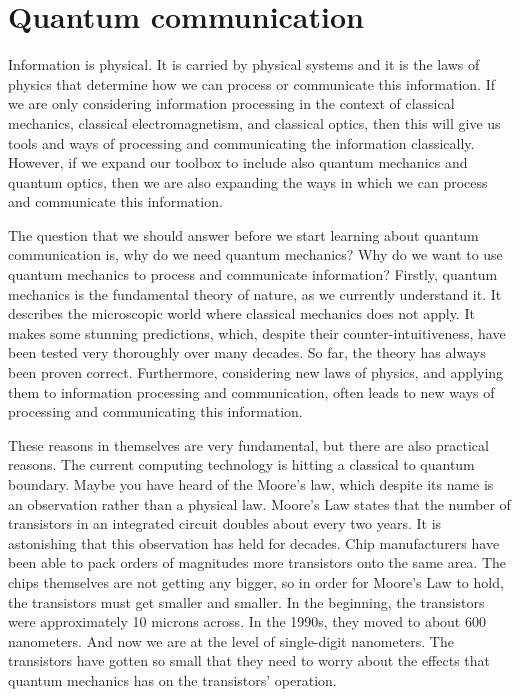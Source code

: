 \section{Quantum communication}

Information is physical.
It is carried by physical systems and it is the laws of physics that determine how we can process or communicate this information.
If we are only considering information processing in the context of classical mechanics, classical electromagnetism, and classical optics, then this will give us tools and ways of processing and communicating the information classically.
However, if we expand our toolbox to include also quantum mechanics and quantum optics, then we are also expanding the ways in which we can process and communicate this information.

The question that we should answer before we start learning about quantum communication is, why do we need quantum mechanics?
Why do we want to use quantum mechanics to process and communicate information? Firstly, quantum mechanics is the fundamental theory of nature, as we currently understand it.
It describes the microscopic world where classical mechanics does not apply.
It makes some stunning predictions, which, despite their counter-intuitiveness, have been tested very thoroughly over many decades.
So far, the theory has always been proven correct.
Furthermore, considering new laws of physics, and applying them to information processing and communication, often leads to new ways of processing and communicating this information.

These reasons in themselves are very fundamental, but there are also practical reasons.
The current computing technology is hitting a classical to quantum boundary.
Maybe you have heard of the Moore's law, which despite its name is an observation rather than a physical law.
Moore's Law states that the number of transistors in an integrated circuit doubles about every two years.
It is astonishing that this observation has held for decades.
Chip manufacturers have been able to pack orders of magnitudes more transistors onto the same area. The chips themselves are not getting any bigger, so in order for Moore's Law to hold, the transistors must get smaller and smaller.
In the beginning, the transistors were approximately 10 microns across.
In the 1990s, they moved to about 600 nanometers.
And now we are at the level of single-digit nanometers.
The transistors have gotten so small that they need to worry about the effects that quantum mechanics has on the transistors' operation.

